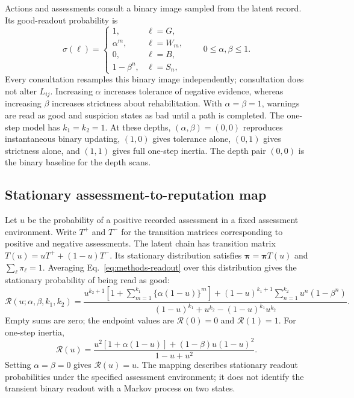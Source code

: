 \documentclass[fleqn,10pt]{article}
\begin{document}
Actions and assessments consult a binary image sampled from the latent record. Its good-readout probability is
\begin{equation}
\sigma(\ell)=
\begin{cases}
1,&\ell=G,\\
\alpha^m,&\ell=W_m,\\
0,&\ell=B,\\
1-\beta^n,&\ell=S_n,
\end{cases}
\qquad 0\leq\alpha,\beta\leq1.
\label{eq:methods-readout}
\end{equation}
Every consultation resamples this binary image independently; consultation does not alter $L_{ij}$. Increasing $\alpha$ increases tolerance of negative evidence, whereas increasing $\beta$ increases strictness about rehabilitation. With $\alpha=\beta=1$, warnings are read as good and suspicion states as bad until a path is completed. The one-step model has $k_1=k_2=1$. At these depths, $(\alpha,\beta)=(0,0)$ reproduces instantaneous binary updating, $(1,0)$ gives tolerance alone, $(0,1)$ gives strictness alone, and $(1,1)$ gives full one-step inertia. The depth pair $(0,0)$ is the binary baseline for the depth scans.

\subsection*{Stationary assessment-to-reputation map}

Let $u$ be the probability of a positive recorded assessment in a fixed assessment environment. Write $T^+$ and $T^-$ for the transition matrices corresponding to positive and negative assessments. The latent chain has transition matrix $T(u)=uT^++(1-u)T^-$. Its stationary distribution satisfies $\boldsymbol\pi=\boldsymbol\pi T(u)$ and $\sum_\ell\pi_\ell=1$. Averaging Eq.~\eqref{eq:methods-readout} over this distribution gives the stationary probability of being read as good:
\begin{equation}
\mathcal R(u;\alpha,\beta,k_1,k_2)=
\frac{
u^{k_2+1}\!\left[1+\sum_{m=1}^{k_1}\{\alpha(1-u)\}^{m}\right]
+(1-u)^{k_1+1}\!\sum_{n=1}^{k_2}u^n(1-\beta^n)
}{(1-u)^{k_1}+u^{k_2}-(1-u)^{k_1}u^{k_2}}.
\label{eq:methods-reputation-map}
\end{equation}
Empty sums are zero; the endpoint values are $\mathcal R(0)=0$ and $\mathcal R(1)=1$. For one-step inertia,
\begin{equation}
\mathcal R(u)=
\frac{u^2[1+\alpha(1-u)]+(1-\beta)u(1-u)^2}
{1-u+u^2}.
\label{eq:methods-one-step-map}
\end{equation}
Setting $\alpha=\beta=0$ gives $\mathcal R(u)=u$. The mapping describes stationary readout probabilities under the specified assessment environment; it does not identify the transient binary readout with a Markov process on two states.
\end{document}
